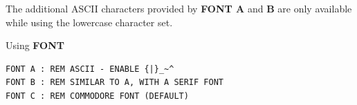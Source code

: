 \begin{description}[leftmargin=2cm,style=nextline]
\item [Remarks:]  The additional ASCII characters provided by {\bf FONT A} and {\bf B} are only available while using the lowercase character set.

\item [Examples:] Using {\bf FONT}

\begin{tcolorbox}[colback=black,coltext=white]
\begin{verbatim}
FONT A : REM ASCII - ENABLE {|}_~^
FONT B : REM SIMILAR TO A, WITH A SERIF FONT
FONT C : REM COMMODORE FONT (DEFAULT)
\end{verbatim}
\end{tcolorbox}
\end{description}


\newpage

